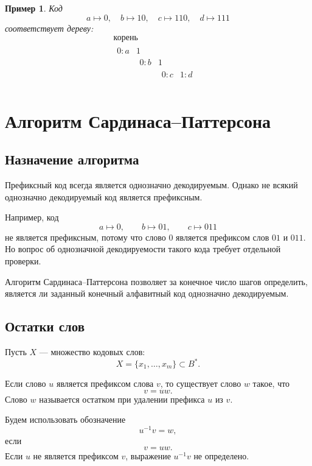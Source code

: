 \documentclass[12pt,a4paper]{article}
\newtheorem{example}{Пример}[section]
\begin{document}
\begin{example}
Код
\[
    a\mapsto 0,\quad b\mapsto 10,\quad c\mapsto 110,\quad d\mapsto 111
\]
соответствует дереву:
\[
\begin{array}{c}
\text{корень}\\[2mm]
\begin{array}{cc}
0:a & 1\\
    & \begin{array}{cc}
      0:b & 1\\
          & \begin{array}{cc}
            0:c & 1:d
          \end{array}
    \end{array}
\end{array}
\end{array}
\]
\end{example}

\section{Алгоритм Сардинаса--Паттерсона}

\subsection{Назначение алгоритма}

Префиксный код всегда является однозначно декодируемым.
Однако не всякий однозначно декодируемый код является префиксным.

Например, код
\[
    a\mapsto 0,\qquad
    b\mapsto 01,\qquad
    c\mapsto 011
\]
не является префиксным, потому что слово $0$ является префиксом слов $01$ и $011$.
Но вопрос об однозначной декодируемости такого кода требует отдельной проверки.

Алгоритм Сардинаса--Паттерсона позволяет за конечное число шагов определить, является ли заданный конечный алфавитный код однозначно декодируемым.

\subsection{Остатки слов}

Пусть $X$ --- множество кодовых слов:
\[
    X=\{x_1,\dots,x_m\}\subset B^*.
\]

Если слово $u$ является префиксом слова $v$, то существует слово $w$ такое, что
\[
    v=uw.
\]
Слово $w$ называется остатком при удалении префикса $u$ из $v$.

Будем использовать обозначение
\[
    u^{-1}v=w,
\]
если
\[
    v=uw.
\]
Если $u$ не является префиксом $v$, выражение $u^{-1}v$ не определено.
\end{document}
